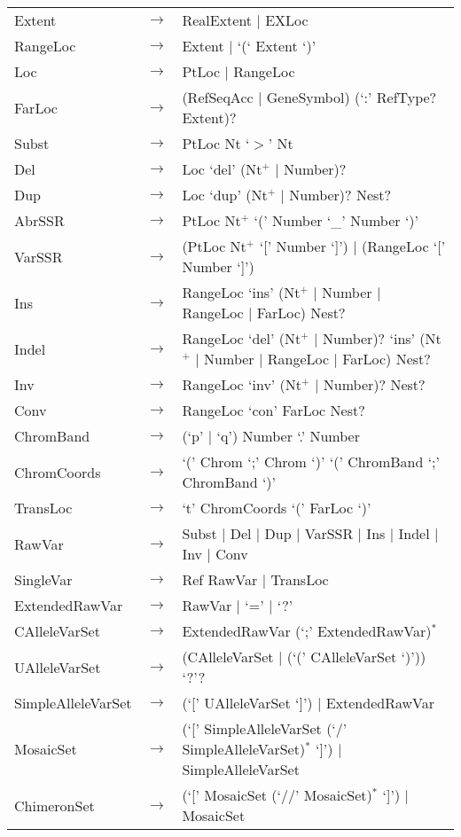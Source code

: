 \begin{longtable}{llp{7cm}}
Extent & $\rightarrow$ & RealExtent $|$ EXLoc\\
RangeLoc & $\rightarrow$ & Extent $|$ `(` Extent `)'\\
Loc & $\rightarrow$ & PtLoc $|$ RangeLoc\\
FarLoc & $\rightarrow$ & (RefSeqAcc $|$ GeneSymbol) (`:' RefType? Extent)? \\
Subst & $\rightarrow$ & PtLoc Nt `$>$' Nt\\
Del & $\rightarrow$ & Loc `del' (Nt$^+$ $|$ Number)?\\
Dup & $\rightarrow$ & Loc `dup' (Nt$^+$ $|$ Number)? Nest?\\
AbrSSR & $\rightarrow$ & PtLoc  Nt$^+$ `(' Number `\_' Number `)'\\
VarSSR & $\rightarrow$ & (PtLoc  Nt$^+$ `[' Number `]') $|$ (RangeLoc `[' Number `]') \\
Ins & $\rightarrow$ & RangeLoc `ins' (Nt$^+$ $|$ Number $|$ RangeLoc $|$ FarLoc) Nest?\\
Indel & $\rightarrow$ & RangeLoc `del' (Nt$^+$ $|$ Number)? `ins' (Nt$^+$ $|$ Number $|$ RangeLoc $|$ FarLoc) Nest?\\
Inv & $\rightarrow$ & RangeLoc `inv' (Nt$^+$ $|$ Number)? Nest?\\
Conv & $\rightarrow$ & RangeLoc `con' FarLoc Nest?\\
ChromBand & $\rightarrow$ & (`p' $|$ `q') Number `.' Number\\
ChromCoords & $\rightarrow$ & `(' Chrom `;' Chrom `)' `(' ChromBand `;' ChromBand `)'\\
TransLoc & $\rightarrow$ & `t' ChromCoords `(' FarLoc `)'\\
RawVar & $\rightarrow$ & Subst $|$ Del $|$ Dup $|$ VarSSR $|$ Ins $|$ Indel $|$ Inv $|$ Conv\\
SingleVar & $\rightarrow$ & Ref RawVar $|$ TransLoc\\
ExtendedRawVar & $\rightarrow$ & RawVar $|$ `=' $|$ `?'\\
CAlleleVarSet & $\rightarrow$ & ExtendedRawVar (`;' ExtendedRawVar)$^*$\\
UAlleleVarSet & $\rightarrow$ & (CAlleleVarSet $|$ (`(' CAlleleVarSet `)')) `?'?\\
SimpleAlleleVarSet & $\rightarrow$ & (`[' UAlleleVarSet `]') $|$ ExtendedRawVar\\
MosaicSet & $\rightarrow$ & (`[' SimpleAlleleVarSet (`/' SimpleAlleleVarSet)$^*$ `]') $|$ SimpleAlleleVarSet\\
ChimeronSet & $\rightarrow$ & (`[' MosaicSet (`//' MosaicSet)$^*$ `]') $|$ MosaicSet\\

\end{longtable}

